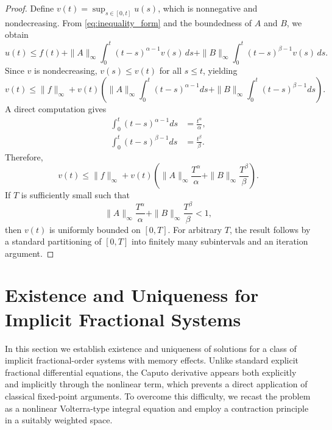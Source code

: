 \documentclass[12pt,a4paper]{article}
\numberwithin{equation}{section}
\begin{document}
	\begin{proof}
		Define $v(t)=\sup_{s\in[0,t]}u(s)$, which is nonnegative and nondecreasing. From \eqref{eq:inequality_form} and the boundedness of $A$ and $B$, we obtain
		\begin{equation}
			u(t) \le f(t) + \|A\|_\infty \int_0^t (t-s)^{\alpha-1} v(s)\,ds + \|B\|_\infty \int_0^t (t-s)^{\beta-1} v(s)\,ds.
			\label{eq:proof_step1}
		\end{equation}
		Since $v$ is nondecreasing, $v(s)\le v(t)$ for all $s\le t$, yielding
		\begin{equation}
			v(t) \le \|f\|_\infty + v(t)\!\left( \|A\|_\infty \int_0^t (t-s)^{\alpha-1} ds + \|B\|_\infty \int_0^t (t-s)^{\beta-1} ds \right).
			\label{eq:proof_step2}
		\end{equation}
		A direct computation gives
		\begin{align}
			\int_0^t (t-s)^{\alpha-1} ds &= \frac{t^\alpha}{\alpha}, \label{eq:integral_alpha} \\
			\int_0^t (t-s)^{\beta-1} ds &= \frac{t^\beta}{\beta}. \label{eq:integral_beta}
		\end{align}
		Therefore,
		\begin{equation}
			v(t) \le \|f\|_\infty + v(t)\left( \|A\|_\infty \frac{T^\alpha}{\alpha} + \|B\|_\infty \frac{T^\beta}{\beta} \right).
			\label{eq:proof_step3}
		\end{equation}
		If $T$ is sufficiently small such that
		\begin{equation}
			\|A\|_\infty \frac{T^\alpha}{\alpha} + \|B\|_\infty \frac{T^\beta}{\beta} < 1,
			\label{eq:condition_T}
		\end{equation}
		then $v(t)$ is uniformly bounded on $[0,T]$. For arbitrary $T$, the result follows by a standard partitioning of $[0,T]$ into finitely many subintervals and an iteration argument.
	\end{proof}
	
	\section{Existence and Uniqueness for Implicit Fractional Systems}
	\label{sec:existence}
	
	In this section we establish existence and uniqueness of solutions for a class of implicit fractional-order systems with memory effects. Unlike standard explicit fractional differential equations, the Caputo derivative appears both explicitly and implicitly through the nonlinear term, which prevents a direct application of classical fixed-point arguments. To overcome this difficulty, we recast the problem as a nonlinear Volterra-type integral equation and employ a contraction principle in a suitably weighted space.
	
\end{document}
